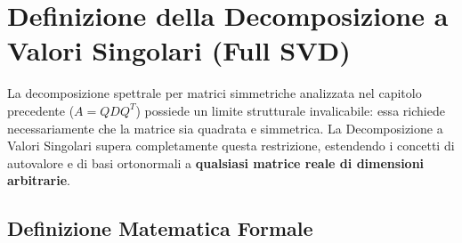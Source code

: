 \FloatBarrier
\section{Definizione della Decomposizione a Valori Singolari (Full SVD)}
\label{sec:svd-definizione-full}

La decomposizione spettrale per matrici simmetriche analizzata nel capitolo precedente ($A = QDQ^T$) possiede un limite strutturale invalicabile: essa richiede necessariamente che la matrice sia quadrata e simmetrica. La Decomposizione a Valori Singolari supera completamente questa restrizione, estendendo i concetti di autovalore e di basi ortonormali a \textbf{qualsiasi matrice reale di dimensioni arbitrarie}.

\subsection{Definizione Matematica Formale}

